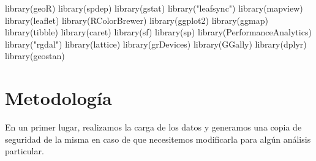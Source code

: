 \documentclass[
  12pt,
]{article}
\newenvironment{Shaded}{\begin{snugshade}}{\end{snugshade}}
\newcommand{\FunctionTok}[1]{\textcolor[rgb]{0.00,0.00,0.00}{#1}}
\newcommand{\NormalTok}[1]{#1}
\newcommand{\StringTok}[1]{\textcolor[rgb]{0.31,0.60,0.02}{#1}}
\begin{document}
\begin{Shaded}
\begin{Highlighting}[]
\FunctionTok{library}\NormalTok{(}\StringTok{\textquotesingle{}geoR\textquotesingle{}}\NormalTok{)}
\FunctionTok{library}\NormalTok{(}\StringTok{\textquotesingle{}spdep\textquotesingle{}}\NormalTok{)}
\FunctionTok{library}\NormalTok{(}\StringTok{\textquotesingle{}gstat\textquotesingle{}}\NormalTok{)}
\FunctionTok{library}\NormalTok{(}\StringTok{"leafsync"}\NormalTok{)}
\FunctionTok{library}\NormalTok{(}\StringTok{\textquotesingle{}mapview\textquotesingle{}}\NormalTok{)}
\FunctionTok{library}\NormalTok{(}\StringTok{\textquotesingle{}leaflet\textquotesingle{}}\NormalTok{)}
\FunctionTok{library}\NormalTok{(}\StringTok{\textquotesingle{}RColorBrewer\textquotesingle{}}\NormalTok{)}
\FunctionTok{library}\NormalTok{(}\StringTok{\textquotesingle{}ggplot2\textquotesingle{}}\NormalTok{)}
\FunctionTok{library}\NormalTok{(}\StringTok{\textquotesingle{}ggmap\textquotesingle{}}\NormalTok{)}
\FunctionTok{library}\NormalTok{(}\StringTok{\textquotesingle{}tibble\textquotesingle{}}\NormalTok{)}
\FunctionTok{library}\NormalTok{(}\StringTok{\textquotesingle{}caret\textquotesingle{}}\NormalTok{)}
\FunctionTok{library}\NormalTok{(}\StringTok{\textquotesingle{}sf\textquotesingle{}}\NormalTok{)}
\FunctionTok{library}\NormalTok{(}\StringTok{\textquotesingle{}sp\textquotesingle{}}\NormalTok{)}
\FunctionTok{library}\NormalTok{(}\StringTok{\textquotesingle{}PerformanceAnalytics\textquotesingle{}}\NormalTok{)}
\FunctionTok{library}\NormalTok{(}\StringTok{"rgdal"}\NormalTok{)}
\FunctionTok{library}\NormalTok{(}\StringTok{\textquotesingle{}lattice\textquotesingle{}}\NormalTok{) }
\FunctionTok{library}\NormalTok{(}\StringTok{\textquotesingle{}grDevices\textquotesingle{}}\NormalTok{)}
\FunctionTok{library}\NormalTok{(}\StringTok{\textquotesingle{}GGally\textquotesingle{}}\NormalTok{)}
\FunctionTok{library}\NormalTok{(}\StringTok{\textquotesingle{}dplyr\textquotesingle{}}\NormalTok{)}
\FunctionTok{library}\NormalTok{(}\StringTok{\textquotesingle{}geostan\textquotesingle{}}\NormalTok{)}
\end{Highlighting}
\end{Shaded}

\hypertarget{metodologuxeda}{%
\section{Metodología}\label{metodologuxeda}}

En un primer lugar, realizamos la carga de los datos y generamos una
copia de seguridad de la misma en caso de que necesitemos modificarla
para algún análisis particular.
\end{document}

